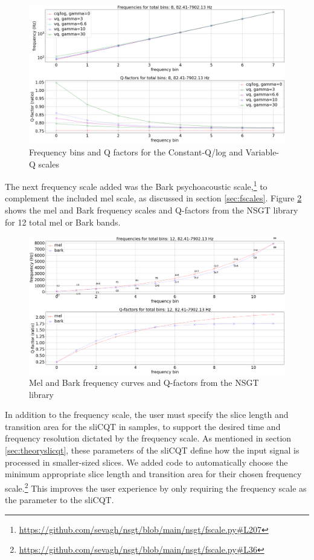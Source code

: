 \documentclass[report.tex]{subfiles}
\begin{document}
\begin{figure}[ht]
	\centering
	\includegraphics[width=\textwidth]{./images-freqscales/vqlog.png}
	\caption{Frequency bins and Q factors for the Constant-Q/log and Variable-Q scales}
	\label{fig:vq}
\end{figure}

The next frequency scale added was the Bark psychoacoustic scale,\footnote{\url{https://github.com/sevagh/nsgt/blob/main/nsgt/fscale.py\#L207}} to complement the included mel scale, as discussed in section \ref{sec:fscales}. Figure \ref{fig:melbarkfsandqs} shows the mel and Bark frequency scales and Q-factors from the NSGT library for 12 total mel or Bark bands.

\begin{figure}[ht]
	\centering
	\includegraphics[width=\textwidth]{./images-freqscales/melbarkpitchesqs.png}
	\caption{Mel and Bark frequency curves and Q-factors from the NSGT library}
	\label{fig:melbarkfsandqs}
\end{figure}

In addition to the frequency scale, the user must specify the slice length and transition area for the sliCQT in samples, to support the desired time and frequency resolution dictated by the frequency scale. As mentioned in section \ref{sec:theoryslicqt}, these parameters of the sliCQT define how the input signal is processed in smaller-sized slices. We added code to automatically choose the minimum appropriate slice length and transition area for their chosen frequency scale.\footnote{\url{https://github.com/sevagh/nsgt/blob/main/nsgt/fscale.py\#L36}} This improves the user experience by only requiring the frequency scale as the parameter to the sliCQT.
\end{document}
